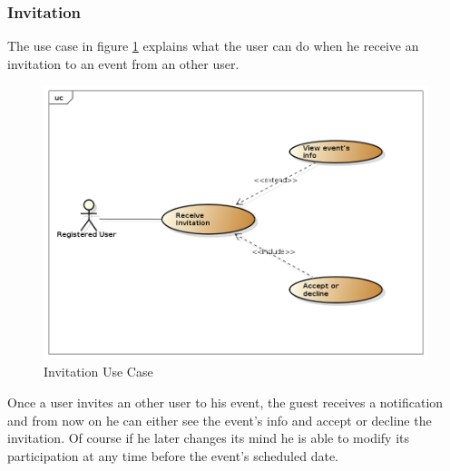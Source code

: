 \subsubsection{Invitation}
The use case in figure \ref{fig:invitusecase} explains what the user can do when he receive an invitation to an event from an other user. 
 \begin{center}
 \begin{figure}[H]
    \includegraphics[width=1\textwidth]{./UMLDiagram/use_case/Invitation/Invitation.png}
    \caption{Invitation Use Case}
     \label{fig:invitusecase}
     \end{figure}
   \end{center}  
Once a user invites an other user to his event, the guest receives a notification and from now on he can either see the event's info and accept or decline the invitation. Of course if he later changes its mind he is able to modify its participation at any time before the event's scheduled date.
